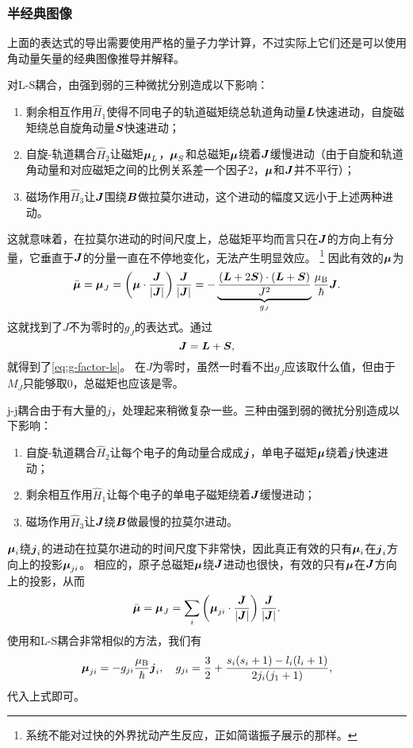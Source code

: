 \documentclass[UTF8, a4paper]{ctexart}
\begin{document}
\subsubsection{半经典图像}

上面的表达式的导出需要使用严格的量子力学计算，不过实际上它们还是可以使用角动量矢量的经典图像推导并解释。

对L-S耦合，由强到弱的三种微扰分别造成以下影响：

\begin{enumerate}
    \item 剩余相互作用$\hat{H}_1$使得不同电子的轨道磁矩绕总轨道角动量$\vb*{L}$快速进动，自旋磁矩绕总自旋角动量$\vb*{S}$快速进动；
    \item 自旋-轨道耦合$\hat{H}_2$让磁矩$\vb*{\mu}_L$，$\vb*{\mu}_S$和总磁矩$\vb*{\mu}$绕着$\vb*{J}$缓慢进动（由于自旋和轨道角动量和对应磁矩之间的比例关系差一个因子2，$\vb*{\mu}$和$\vb*{J}$并不平行）；
    \item 磁场作用$\hat{H}_3$让$\vb*{J}$围绕$\vb*{B}$做拉莫尔进动，这个进动的幅度又远小于上述两种进动。
\end{enumerate}

这就意味着，在拉莫尔进动的时间尺度上，总磁矩平均而言只在$\vb*{J}$的方向上有分量，它垂直于$\vb*{J}$的分量一直在不停地变化，无法产生明显效应。%
\footnote{系统不能对过快的外界扰动产生反应，正如简谐振子展示的那样。}%
因此有效的$\vb*{\mu}$为
\[
    \bar{\vb*{\mu}} = \vb*{\mu}_J = \left(\vb*{\mu} \cdot \frac{\vb*{J}}{\abs{\vb*{J}}}\right) \frac{\vb*{J}}{\abs{\vb*{J}}} = - \underbrace{\frac{(\vb*{L} + 2\vb*{S}) \cdot (\vb*{L} + \vb*{S})}{J^2}}_{g_J} \frac{\mu_\text{B}}{\hbar} \vb*{J}.
\]
这就找到了$J$不为零时的$g_J$的表达式。通过
\[
    \vb*{J} = \vb*{L} + \vb*{S},
\]
就得到了\eqref{eq:g-factor-ls}。
在$J$为零时，虽然一时看不出$g_J$应该取什么值，但由于$M_J$只能够取$0$，总磁矩也应该是零。

j-j耦合由于有大量的$j$，处理起来稍微复杂一些。三种由强到弱的微扰分别造成以下影响：
\begin{enumerate}
    \item 自旋-轨道耦合$\hat{H}_2$让每个电子的角动量合成成$\vb*{j}$，单电子磁矩$\vb*{\mu}$绕着$\vb*{j}$快速进动；
    \item 剩余相互作用$\hat{H}_1$让每个电子的单电子磁矩绕着$\vb*{J}$缓慢进动；
    \item 磁场作用$\hat{H}_3$让$\vb*{J}$绕$\vb*{B}$做最慢的拉莫尔进动。
\end{enumerate}
$\vb*{\mu}_i$绕$\vb*{j}_i$的进动在拉莫尔进动的时间尺度下非常快，因此真正有效的只有$\vb*{\mu}_i$在$\vb*{j}_i$方向上的投影$\vb*{\mu}_{j i}$。
相应的，原子总磁矩$\vb*{\mu}$绕$\vb*{J}$进动也很快，有效的只有$\vb*{\mu}$在$\vb*{J}$方向上的投影，从而
\[
    \bar{\vb*{\mu}} = \vb*{\mu}_J = \sum_i \left( \vb*{\mu}_{j i} \cdot \frac{\vb*{J}}{\abs{\vb*{J}}} \right) \frac{\vb*{J}}{\abs{\vb*{J}}}.
\]
使用和L-S耦合非常相似的方法，我们有
\begin{equation}
    \vb*{\mu}_{j i} = - g_{j i} \frac{\mu_\text{B}}{\hbar} \vb*{j}_i, \quad g_{j i} = \frac{3}{2} + \frac{s_i(s_i + 1) - l_i (l_i + 1)}{2 j_i (j_1 + 1)},
\end{equation}
代入上式即可。
\end{document}
